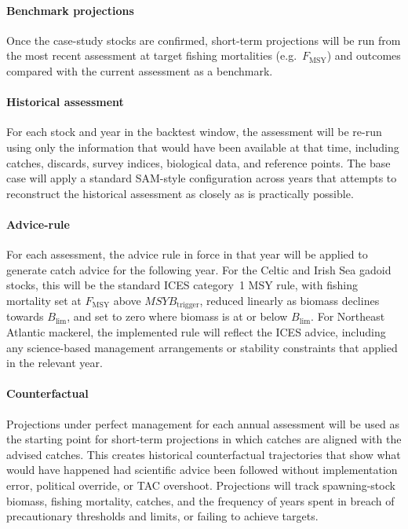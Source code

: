 \documentclass[11pt,a4paper]{extarticle}
\begin{document}
	\paragraph{Benchmark projections}
	Once the case-study stocks are confirmed, short-term projections will be run from the most recent assessment at target fishing mortalities (e.g.\ \(F_{\mathrm{MSY}}\)) and outcomes compared with the current assessment as a benchmark.
	
	\paragraph{Historical assessment}
	For each stock and year in the backtest window, the assessment will be re-run using only the information that would have been available at that time, including catches, discards, survey indices, biological data, and reference points. The base case will apply a standard SAM-style configuration across years that attempts to reconstruct the historical assessment as closely as is practically possible.
	
	\paragraph{Advice-rule}
	For each assessment, the advice rule in force in that year will be applied to generate catch advice for the following year. For the Celtic and Irish Sea gadoid stocks, this will be the standard ICES category~1 MSY rule, with fishing mortality set at \(F_{\mathrm{MSY}}\) above \(MSYB_{\mathrm{trigger}}\), reduced linearly as biomass declines towards \(B_{\lim}\), and set to zero where biomass is at or below \(B_{\lim}\). For Northeast Atlantic mackerel, the implemented rule will reflect the ICES advice, including any science-based management arrangements or stability constraints that applied in the relevant year.
	
	\paragraph{Counterfactual}
	Projections under perfect management for each annual assessment will be used as the starting point for short-term projections in which catches are aligned with the advised catches. This creates historical counterfactual trajectories that show what would have happened had scientific advice been followed without implementation error, political override, or TAC overshoot. Projections will track spawning-stock biomass, fishing mortality, catches, and the frequency of years spent in breach of precautionary thresholds and limits, or failing to achieve targets.
	
\end{document}

